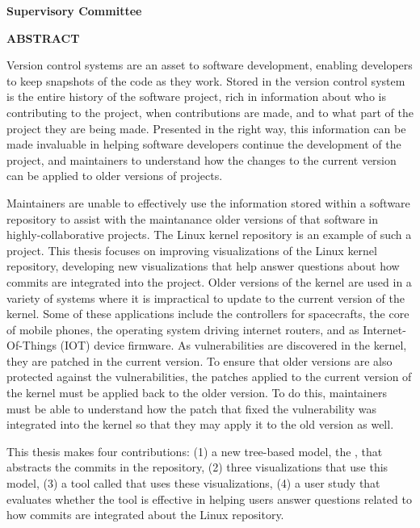 \newpage
{}

\noindent \textbf{Supervisory Committee}
\tpbreak
\panel

\begin{flushleft}
  \textbf{ABSTRACT}

  Version control systems are an asset to software development, enabling
  developers to keep snapshots of the code as they work.
  Stored in the version control system is the entire history of the
  software project, rich in information about who is contributing to the
  project, when contributions are made, and to what part of the project
  they are being made.
  Presented in the right way, this information can be made invaluable in
  helping software developers continue the development of the project,
  and maintainers to understand how the changes to the current version
  can be applied to older versions of projects.

  Maintainers are unable to effectively use the information stored
  within a software repository to assist with the maintanance older
  versions of that software in highly-collaborative projects.
  The Linux kernel repository is an example of such a project.
  This thesis focuses on improving visualizations of the Linux kernel
  repository, developing new visualizations that help answer questions
  about how commits are integrated into the project.
  Older versions of the kernel are used in a variety of systems where it
  is impractical to update to the current version of the kernel.
  Some of these applications include the controllers for spacecrafts,
  the
  core of mobile phones, the operating system driving internet routers,
  and as Internet-Of-Things (IOT) device firmware.
  As vulnerabilities are discovered in the kernel, they are patched in
  the current version.
  To ensure that older versions are also protected against the
  vulnerabilities, the patches applied to the current version of the
  kernel must be applied back to the older version.
  To do this, maintainers must be able to understand how the patch that
  fixed the vulnerability was integrated into the kernel so that they
  may apply it to the old version as well.

  This thesis makes four contributions:
  (1) a new tree-based model, the \mt{}, that abstracts the commits in the repository,
  (2) three visualizations that use this model,
  (3) a tool called \tool{} that uses these visualizations,
  (4) a user study
  that evaluates whether the tool is effective in helping users answer
  questions related to how commits are integrated about the Linux
  repository.



\end{flushleft}
